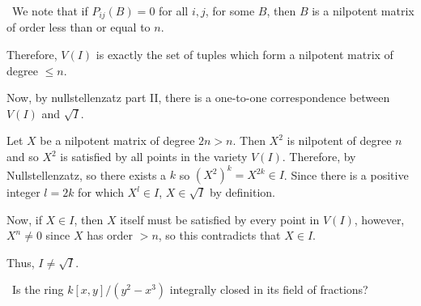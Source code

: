 \documentclass[12pt]{Qual}
\begin{document}
\begin{solution}$\,$
We note that if $P_{ij}(B)=0$ for all $i,j$, for some $B$, then $B$ is a nilpotent matrix of order less than or equal to $n$.

Therefore, $V(I)$ is exactly the set of tuples which form a nilpotent matrix of degree $\le n$.

Now, by nullstellenzatz part II, there is a one-to-one correspondence between $V(I)$ and $\sqrt{I}$.

Let $X$ be a nilpotent matrix of degree $2n>n$. Then $X^2$ is nilpotent of degree $n$ and so $X^2$ is satisfied by all points in the variety $V(I)$. Therefore, by Nullstellenzatz, so there exists a $k$ so $(X^2)^k=X^{2k}\in I$. Since there is a positive integer $l=2k$ for which $X^l\in I$, $X\in\sqrt{I}$ by definition.

Now, if $X\in I$, then $X$ itself must be satisfied by every point in $V(I)$, however, $X^n\not=0$ since $X$ has order $>n$, so this contradicts that $X\in I.$

Thus, $I\not=\sqrt{I}$.
\end{solution}
\newpage



\begin{problem} $\,$
Is the ring $k[x,y]/(y^2-x^3)$ integrally closed in its field of fractions?
\end{problem}
\end{document}
